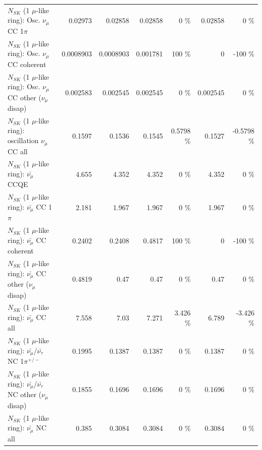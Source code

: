 \begin{table}
\begin{tabular}{| l | r | r | r  r | r  r |}
                          $N_{SK}$ (1 $\mu$-like ring): Osc. $\nu_\mu$ CC 1$\pi$ &         0.02973 &         0.02858 &         0.02858 &        0 \%  &         0.02858 &        0 \%  \\ 
                        $N_{SK}$ (1 $\mu$-like ring): Osc. $\nu_\mu$ CC coherent &       0.0008903 &       0.0008903 &        0.001781 &      100 \%  &               0 &     -100 \%  \\ 
         $N_{SK}$ (1 $\mu$-like ring): Osc. $\nu_\mu$ CC other ($\nu_\mu$ disap) &        0.002583 &        0.002545 &        0.002545 &        0 \%  &        0.002545 &        0 \%  \\ 
                      $N_{SK}$ (1 $\mu$-like ring): oscillation $\nu_\mu$ CC all &          0.1597 &          0.1536 &          0.1545 &   0.5798 \%  &          0.1527 &  -0.5798 \%  \\ 
\hline
\hline
                              $N_{SK}$ (1 $\mu$-like ring): $\bar{\nu_\mu}$ CCQE &           4.655 &           4.352 &           4.352 &        0 \%  &           4.352 &        0 \%  \\ 
                         $N_{SK}$ (1 $\mu$-like ring): $\bar{\nu_\mu}$ CC 1$\pi$ &           2.181 &           1.967 &           1.967 &        0 \%  &           1.967 &        0 \%  \\ 
                       $N_{SK}$ (1 $\mu$-like ring): $\bar{\nu_\mu}$ CC coherent &          0.2402 &          0.2408 &          0.4817 &      100 \%  &               0 &     -100 \%  \\ 
        $N_{SK}$ (1 $\mu$-like ring): $\bar{\nu_\mu}$ CC other ($\nu_\mu$ disap) &          0.4819 &            0.47 &            0.47 &        0 \%  &            0.47 &        0 \%  \\ 
                          $N_{SK}$ (1 $\mu$-like ring): $\bar{\nu_{\mu}}$ CC all &           7.558 &            7.03 &           7.271 &    3.426 \%  &           6.789 &   -3.426 \%  \\ 
\hline
  $N_{SK}$ (1 $\mu$-like ring): $\bar{\nu_\mu}$/$\bar{\nu_\tau}$ NC 1$\pi^{+/-}$ &          0.1995 &          0.1387 &          0.1387 &        0 \%  &          0.1387 &        0 \%  \\ 
$N_{SK}$ (1 $\mu$-like ring): $\bar{\nu_\mu}$/$\bar{\nu_\tau}$ NC other ($\nu_\mu$ disap) &          0.1855 &          0.1696 &          0.1696 &        0 \%  &          0.1696 &        0 \%  \\ 
                          $N_{SK}$ (1 $\mu$-like ring): $\bar{\nu_{\mu}}$ NC all &           0.385 &          0.3084 &          0.3084 &        0 \%  &          0.3084 &        0 \%  \\ 

\end{tabular}
\end{table}
